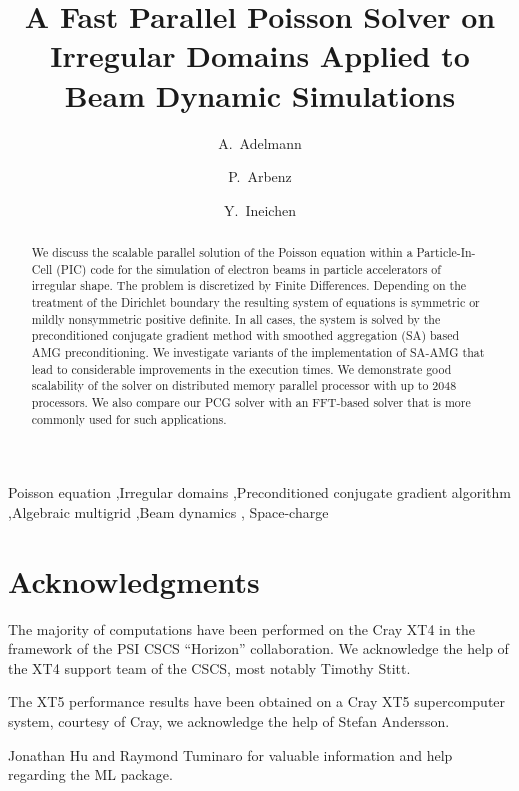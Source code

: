 \documentclass[a4paper,10pt,3p,preprint,pdftex]{elsarticle}
\title{A Fast Parallel Poisson Solver on Irregular Domains Applied to Beam
  Dynamic Simulations}
\author[psi]{A.~Adelmann\corref{cor}}
\author[eth]{P.~Arbenz}
\author[psi,eth]{Y.~Ineichen}
\begin{document}
\begin{keyword}
  Poisson equation \sep Irregular domains \sep Preconditioned conjugate
  gradient algorithm \sep Algebraic multigrid \sep Beam dynamics \sep
  Space-charge
\end{keyword}

\begin{abstract}
  We discuss the scalable parallel solution of the Poisson equation
  within a Particle-In-Cell (PIC) code for the simulation of electron
  beams in particle accelerators of irregular shape.  The problem is
  discretized by Finite Differences.  Depending on the treatment of the
  Dirichlet boundary the resulting system of equations is symmetric or
  mildly nonsymmetric positive definite.  In all cases, the system is
  solved by the preconditioned conjugate gradient method with smoothed
  aggregation (SA) based AMG preconditioning.  We investigate variants
  of the implementation of SA-AMG that lead to considerable improvements
  in the execution times.  We demonstrate good scalability of the solver
  on distributed memory parallel processor with up to 2048 processors.
  We also compare our PCG solver with an FFT-based solver that is more
  commonly used for such applications.
\end{abstract}

\maketitle

\nocite{*}








\section*{Acknowledgments}

The majority of computations have been performed on the Cray XT4 in the
framework of the PSI CSCS ``Horizon'' collaboration. We acknowledge the
help of the XT4 support team of the CSCS, most notably Timothy Stitt.

The XT5 performance results have been obtained on a Cray XT5
supercomputer system, courtesy of Cray, we acknowledge the help of
Stefan Andersson.

Jonathan Hu and Raymond Tuminaro for valuable information and help
regarding the ML package.



\end{document}
